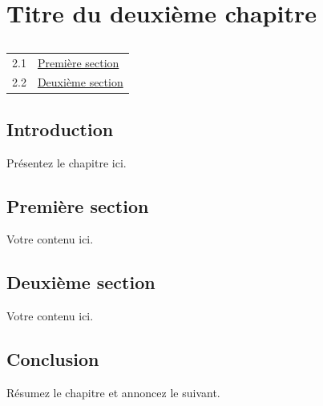 \chapter{Titre du deuxième chapitre}

\section*{\outlinename}
\begin{center}
\begin{tabular}{cl}
  2.1 & \hyperref[sec:ch2-first]{Première section} \\
  2.2 & \hyperref[sec:ch2-second]{Deuxième section} \\
\end{tabular}
\end{center}

\section*{Introduction}

Présentez le chapitre ici.

\vfill
\newpage

\section{Première section}\label{sec:ch2-first}

Votre contenu ici.

\section{Deuxième section}\label{sec:ch2-second}

Votre contenu ici.

\section*{Conclusion}

Résumez le chapitre et annoncez le suivant.

\newpage
